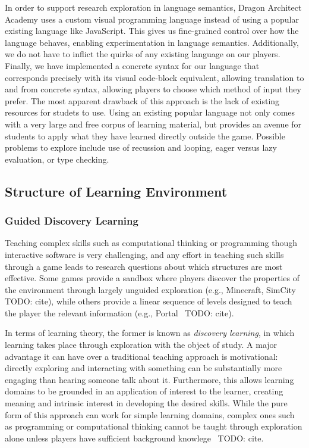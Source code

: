 \documentclass{sig-alternate}
\newcommand{\TODO}[1]{{\color{red} TODO: #1}}
\newcommand{\gametitle}{{\color{RoyalPurple} Dragon Architect Academy}}
\begin{document}
In order to support research exploration in language semantics, \gametitle{} uses a custom visual programming language instead of using a popular existing language like JavaScript. 
This gives us fine-grained control over how the language behaves, enabling experimentation in language semantics.
Additionally, we do not have to inflict the quirks of any existing language on our players. 
Finally, we have implemented a concrete syntax for our language that corresponds precisely with its visual code-block equivalent, allowing translation to and from concrete syntax, allowing players to choose which method of input they prefer.  
The most apparent drawback of this approach is the lack of existing resources for studets to use.
Using an existing popular language not only comes with a very large and free corpus of learning material, but provides an avenue for students to apply what they have learned directly outside the game.
Possible problems to explore include use of recussion and looping, eager versus lazy evaluation, or type checking.

\subsection{Structure of Learning Environment}

\subsubsection{Guided Discovery Learning}
\label{sec:guided_discovery_theory}

Teaching complex skills such as computational thinking or programming though interactive software is very challenging, and any effort in teaching such skills through a game leads to research questions about which structures are most effective.
Some games provide a sandbox where players discover the properties of the environment through largely unguided exploration (e.g., Minecraft, SimCity~\TODO{cite}), while others provide a linear sequence of levels designed to teach the player the relevant information (e.g., Portal~\TODO{cite}). 

In terms of learning theory, the former is known as \emph{discovery learning}, in which learning takes place through exploration with the object of study.
A major advantage it can have over a traditional teaching approach is motivational: directly exploring and interacting with something can be substantially more engaging than hearing someone talk about it.
Furthermore, this allows learning domains to be grounded in an application of interest to the learner, creating meaning and intrinsic interest in developing the desired skills.
While the pure form of this approach can work for simple learning domains, complex ones such as programming or computational thinking cannot be taught through exploration alone unless players have sufficient background knowlege~\TODO{cite}.
\end{document}
